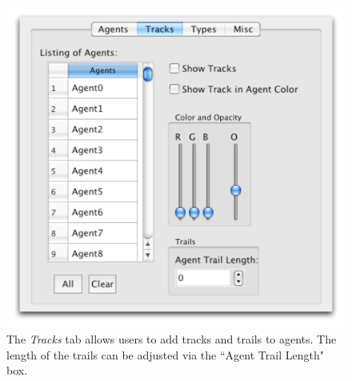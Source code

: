 \documentclass{vgtc}
\begin{document}
\begin{figure}
\centering
\includegraphics[scale=.5]{images/trackstab.pdf}
\caption{
The \textit{Tracks} tab allows users to add tracks and trails to agents. The length of the trails can be adjusted 
via the ``Agent Trail Length" box. }
\label{TracksTab}
\end{figure}
\end{document}
